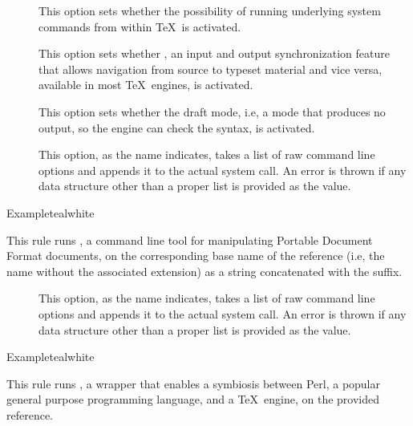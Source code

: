 \begin{description}
\begin{description}
\item[] This option sets whether the possibility of running underlying system commands from within \TeX\ is activated.

\item[] This option sets whether , an input and output synchronization feature that allows navigation from source to typeset material and vice versa, available in most \TeX\ engines, is activated.

\item[] This option sets whether the draft mode, i.e, a mode that produces no output, so the engine can check the syntax, is activated.

\item[] This option, as the name indicates, takes a list of raw command line options and appends it to the actual system call. An error is thrown if any data structure other than a proper list is provided as the value.
\end{description}

\begin{codebox}{Example}{teal}{\icnote}{white}
\end{codebox}

\item[\rulebox{pdftk}]
This rule runs , a command line tool for manipulating Portable Document Format documents, on the corresponding base name of the  reference (i.e, the name without the associated extension) as a string concatenated with the  suffix.

\begin{description}
\item[] This option, as the name indicates, takes a list of raw command line options and appends it to the actual system call. An error is thrown if any data structure other than a proper list is provided as the value.
\end{description}

\begin{codebox}{Example}{teal}{\icnote}{white}
\end{codebox}

\item[\rulebox{perltex}]
This rule runs , a wrapper that enables a symbiosis between Perl, a popular general purpose programming language, and a \TeX\ engine, on the provided  reference.


\end{description}
